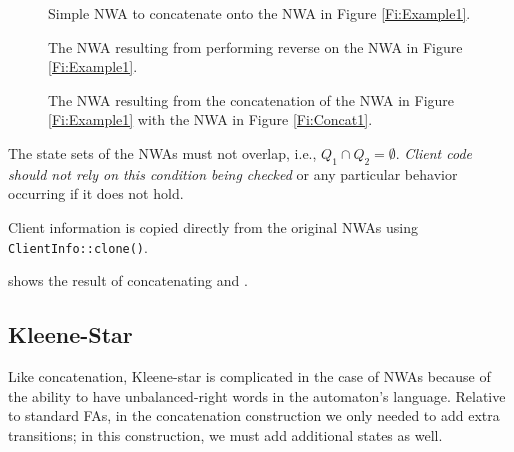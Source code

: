 \begin{figure}[p]
  \centering
  \begin{minipage}{0.5\textwidth}
    \begin{minipage}{\textwidth}
      \centering
      \caption{Simple NWA to concatenate onto the NWA in Figure \ref{Fi:Example1}.}
      \label{Fi:Concat1}
    \end{minipage}

    \vspace{2\baselineskip}
    \begin{minipage}{0.8\textwidth}
      \centering
      \caption{The NWA resulting from performing reverse on the NWA in Figure \ref{Fi:Example1}.}
      \label{Fi:Reverse1}
    \end{minipage}
  \end{minipage}
  \begin{minipage}{0.49\textwidth}
    \centering
    \caption{The NWA resulting from the concatenation of the NWA in Figure
      \ref{Fi:Example1} with the NWA in Figure \ref{Fi:Concat1}.}
    \label{Fi:Concat2}
  \end{minipage}
\end{figure}

\antistupidfloats



The state sets of the NWAs must not overlap,
i.e., $Q_1 \cap Q_2 = \emptyset$. \textsl{Client code should not rely on
  this condition being checked} or any particular behavior occurring if it
does not hold.

Client information is copied directly from the original NWAs using
\texttt{ClientInfo::clone()}.

 shows the result of concatenating  and
.

\subsection{Kleene-Star}
\label{Se:Star}

Like concatenation, Kleene-star is complicated in the case of NWAs because of
the ability to have unbalanced-right words in the automaton's
language. Relative to standard FAs, in the concatenation construction we only needed
to add extra transitions; in this construction, we must add additional states as well.

